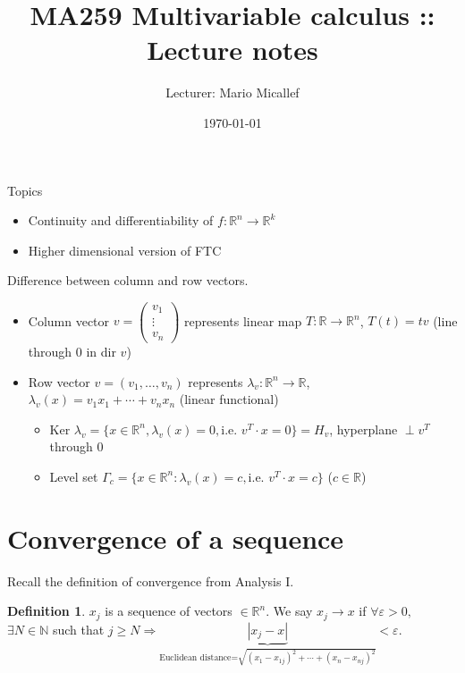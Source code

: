 \documentclass[a4paper]{article}
\title{MA259 Multivariable calculus :: Lecture notes}
\author{Lecturer: Mario Micallef}
\date{\today}
\theoremstyle{definition}
\newtheorem{defn}{Definition}[subsection]
\begin{document}
\maketitle
\thispagestyle{empty}

\tableofcontents
\thispagestyle{empty}
\newpage
\setcounter{page}{1}

Topics
\begin{itemize}
	\item Continuity and differentiability of $f: \mathbb{R}^n \rightarrow \mathbb{R}^k$
	\item Higher dimensional version of FTC
\end{itemize}

Difference between column and row vectors.

\begin{itemize}
	\item Column vector $v=\begin{pmatrix}
		v_1 \\ \vdots \\ v_n
	\end{pmatrix}$ represents linear map $T: \mathbb{R} \rightarrow \mathbb{R}^n$, $T(t) = tv$ (line through 0 in dir $v$)
	\item Row vector $v=(v_1,\ldots,v_n)$ represents $\lambda_v:\mathbb{R}^n \rightarrow \mathbb{R}$, $\lambda_v(x)=v_1x_1+\cdots+v_nx_n$ (linear functional)
	\begin{itemize}
		\item Ker $\lambda_v = \{ x \in \mathbb{R}^n, \lambda_v(x)=0, \text{i.e. }v^T \cdot x =0 \}=H_v$, hyperplane $\perp v^T$ through 0
		\item Level set $\Gamma_c=\{ x \in \mathbb{R}^n : \lambda_v(x)=c, \text{i.e. } v^T \cdot x=c \}$ ($c\in \mathbb{R}$)
	\end{itemize} 
\end{itemize}

\section{Convergence of a sequence}
Recall the definition of convergence from Analysis I.
\begin{defn}
	$x_j$ is a sequence of vectors $\in \mathbb{R}^n$. We say $x_j \rightarrow x$ if $\forall \varepsilon > 0,$ $\exists N \in \mathbb N$ such that $j \geq N \Rightarrow \underbrace{|x_j-x|}_{\text{Euclidean distance=}\sqrt{(x_1-x_{1j})^2+\cdots +(x_n-x_{nj})^2}} < \varepsilon$.
\end{defn}
\end{document}
